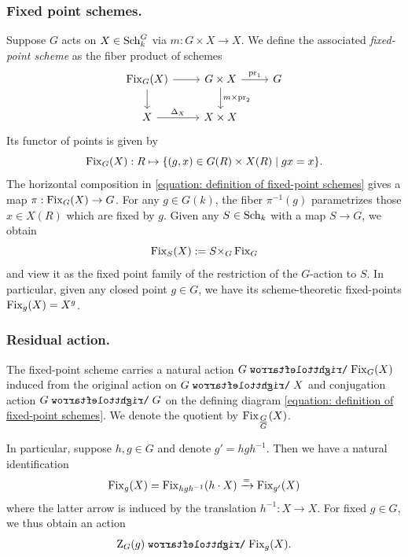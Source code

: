 \subsubsection{Fixed point schemes.}
Suppose $G$ acts on $X \in \operatorname{Sch}^G_k$ via $m: G\times X \to X$.  We define the associated \textit{fixed-point scheme} as the fiber product of schemes
\begin{equation}\label{equation: definition of fixed-point schemes}
\begin{tikzcd}
\Fix_G(X) \arrow[r] \arrow[d] & G\times X \arrow[d, "m \times \pr_2"] \arrow[r, "\pr_1"] & G \\
X \arrow[r, "\Delta_X"] & X\times X
\end{tikzcd}
\end{equation}
Its functor of points is given by
\begin{equation*}
    \operatorname{Fix}_G(X): R \mapsto \{ (g, x) \in G(R) \times X(R) \mid gx = x \}.
\end{equation*}
The horizontal composition in \eqref{equation: definition of fixed-point schemes} gives a map $\pi: \operatorname{Fix}_G(X) \to G$. For any $g \in G(k)$, the fiber $\pi^{-1}(g)$ parametrizes those $x \in X(R)$ which are fixed by $g$. 
Given any $S \in \operatorname{Sch}_k$ with a map $S \to G$, we obtain
\begin{equation}
\operatorname{Fix}_S(X) := S {\times}_G \operatorname{Fix}_G     
\end{equation}
and view it as the fixed point family of the restriction of the $G$-action to $S$. In particular, given any closed point $g \in G$, we have its scheme-theoretic fixed-points $\operatorname{Fix}_g(X) = X^g$.

\subsubsection{Residual action.}\label{section: residual action on Fix}
The fixed-point scheme carries a natural action $G \acts \Fix_G(X)$ induced from the original action on $G \acts X$ and conjugation action $G \acts G$ on the defining diagram  \eqref{equation: definition of fixed-point schemes}. We denote the quotient by $\operatorname{Fix}_{\tfrac{G}{G}}(X)$.

In particular, suppose $h, g \in G$ and denote $g' = hgh^{-1}$. Then we have a natural identification
\begin{equation*}
    \operatorname{Fix}_{g}(X) = \operatorname{Fix}_{hgh^{-1}}(h\cdot X) \xrightarrow{=} \operatorname{Fix}_{g'}(X)
\end{equation*}
where the latter arrow is induced by the translation $h^{-1}: X \to X$.
For fixed $g \in G$, we thus obtain an action
\begin{equation*}
    \Cent_G(g) \acts \Fix_g(X).
\end{equation*}


